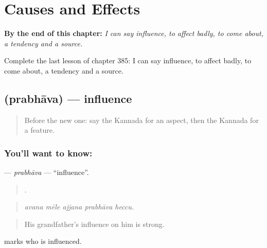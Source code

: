 
\chapter{Causes and Effects}
\label{ch:ka-causes-and-effects}

\begin{chapteropening}
\textbf{By the end of this chapter:} \emph{I can say influence, to affect badly, to come about, a tendency and a source.}

Complete the last lesson of chapter 385: I can say influence, to affect badly, to come about, a tendency and a source.
\end{chapteropening}

\section[\texorpdfstring{\kn{ಪ್ರಭಾವ} (prabhāva)}{ಪ್ರಭಾವ (prabhāva)}]{ (prabhāva) — influence}

\label{lesson:KA-C385-prabhava}



\begin{quote}
Before the new one: say the Kannada for an aspect, then the Kannada for a feature.
\end{quote}

\subsection*{You'll want to know: }
\textbf{} — \emph{prabhāva} — \textquotedblleft{}influence\textquotedblright{}.

\begin{quote}
    .
\end{quote}

\begin{quote}
\emph{avana mēle ajjana prabhāva heccu.}
\end{quote}

\begin{quote}
His grandfather's influence on him is strong.
\end{quote}

 marks who is influenced.


